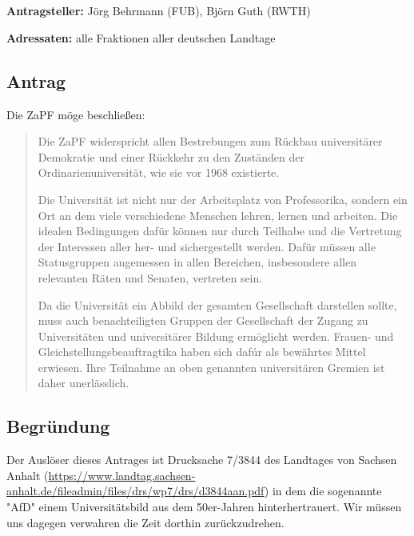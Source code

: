 \documentclass[draft,10pt,oneside]{scrartcl}
\begin{document}
\section*{}

\textbf{Antragsteller:} Jörg Behrmann (FUB), Björn Guth (RWTH)

\textbf{Adressaten:} alle Fraktionen aller deutschen Landtage

\subsection*{Antrag}

Die ZaPF möge beschließen:

\begin{quote}
Die ZaPF widerspricht allen Bestrebungen zum Rückbau universitärer Demokratie
und einer Rückkehr zu den Zuständen der Ordinarienuniversität, wie sie vor 1968
existierte.

Die Universität ist nicht nur der Arbeitsplatz von Professorika, sondern ein Ort
an dem viele verschiedene Menschen lehren, lernen und arbeiten. Die idealen
Bedingungen dafür können nur durch Teilhabe und die Vertretung der Interessen
aller her- und sichergestellt werden. Dafür müssen alle Statusgruppen angemessen
in allen Bereichen, insbesondere allen relevanten Räten und Senaten, vertreten
sein.

Da die Universität ein Abbild der gesamten Gesellschaft darstellen sollte, muss
auch benachteiligten Gruppen der Gesellschaft der Zugang zu Universitäten und
universitärer Bildung ermöglicht werden. Frauen- und
Gleichstellungsbeauftragtika haben sich dafúr als bewährtes Mittel
erwiesen. Ihre Teilnahme an oben genannten universitären Gremien ist daher
unerlässlich.
\end{quote}

\subsection*{Begründung}

Der Auslöser dieses Antrages ist Drucksache 7/3844 des Landtages von Sachsen
Anhalt
(\url{https://www.landtag.sachsen-anhalt.de/fileadmin/files/drs/wp7/drs/d3844aan.pdf})
in dem die sogenannte "AfD" einem Universitätsbild aus dem 50er-Jahren
hinterhertrauert. Wir müssen uns dagegen verwahren die Zeit dorthin
zurückzudrehen.
\end{document}
